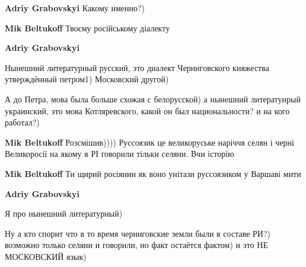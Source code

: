 \begin{itemize}
\begin{itemize}
\textbf{Adriy Grabovskyi} Какому именно?)

 
\textbf{Mik Beltukoff} Твоєму російському діалекту

 
\textbf{Adriy Grabovskyi} 

Нынешний литературный русский, это диалект Черниговского княжества утверждённый
петром1) Московский другой)

А до Петра, мова была больше схожая с белорусской) а нынешний литератунрый
украинский, это мова Котляревского, какой он был национальности? и на кого
работал?)


 
\textbf{Mik Beltukoff} Розсмішив)))) Руссоязик це великоруське наріччя селян і
черні Великоросії на якому в РІ говорили тільки селяни. Вчи історію

 
\textbf{Mik Beltukoff} Ти щирий росіянин як воно унітази руссоязиком у Варшаві мити

 
\textbf{Adriy Grabovskyi} 

Я про нынешний литературный)

Ну а кто спорит что в то время черниговские земли были в составе РИ?) возможно
только селяни и говорили, но факт остаётся фактом) и это НЕ МОСКОВСКИЙ язык)


\end{itemize}
\end{itemize}
